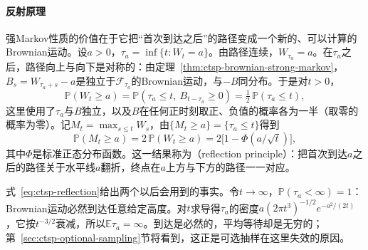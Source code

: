 \paragraph{反射原理}
强Markov性质的价值在于它把“首次到达之后”的路径变成一个新的、可以计算的Brownian运动。设$a>0$，$\tau_a=\inf\{t:W_t=a\}$。由路径连续，$W_{\tau_a}=a$。在$\tau_a$之后，路径向上与向下是对称的：由定理~\ref{thm:ctsp-brownian-strong-markov}，$B_s=W_{\tau_a+s}-a$是独立于$\mathcal F_{\tau_a}$的Brownian运动，与$-B$同分布。于是对$t>0$，
\[
  \mathbb P(W_t\geq a)=\mathbb P(\tau_a\leq t,\ B_{t-\tau_a}\geq0)=\tfrac12\,\mathbb P(\tau_a\leq t),
\]
这里使用了$\tau_a$与$B$独立，以及$B$在任何正时刻取正、负值的概率各为一半（取零的概率为零）。记$M_t=\max_{s\leq t}W_s$，由$\{M_t\geq a\}=\{\tau_a\leq t\}$得到
\begin{equation}
  \mathbb P(M_t\geq a)=2\,\mathbb P(W_t\geq a)=2\bigl[1-\Phi(a/\sqrt t)\bigr],
  \label{eq:ctsp-reflection}
\end{equation}
其中$\Phi$是标准正态分布函数。这一结果称为（reflection principle）：把首次到达$a$之后的路径关于水平线$a$翻折，终点在$a$上方与下方的路径一一对应。

式~\eqref{eq:ctsp-reflection}给出两个以后会用到的事实。令$t\to\infty$，$\mathbb P(\tau_a<\infty)=1$：Brownian运动必然到达任意给定高度。对$t$求导得$\tau_a$的密度$a(2\pi t^3)^{-1/2}e^{-a^2/(2t)}$，它按$t^{-3/2}$衰减，所以$\mathbb E\tau_a=\infty$。到达是必然的，平均等待却是无穷的；第~\ref{sec:ctsp-optional-sampling}节将看到，这正是可选抽样在这里失效的原因。
